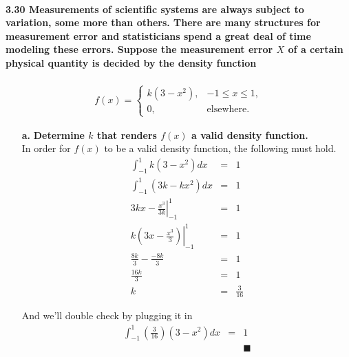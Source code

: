 \documentclass{article}
\begin{document}
\paragraph{3.30 Measurements of scientific systems are always subject to
variation, some more than others. There are many structures for measurement 
error and statisticians spend a great deal of time modeling these errors. 
Suppose the measurement error $X$ of a certain physical quantity is decided 
by the density function}
\begin{eqnarray*}
f(x) = \left\{ \begin{array}{ll}
	k(3-x^2), & -1 \leq x \leq 1,\\
	0, & \mbox{elsewhere.}
	\end{array} \right.
\end{eqnarray*}
\begin{enumerate}
\item[\textbf{a.}] \textbf{Determine $k$ that renders $f(x)$ a valid density
function.\\}
In order for $f(x)$ to be a valid density function, the following must hold.
\begin{eqnarray*}
\int_{-1}^1 k(3-x^2)dx & = & 1\\
\int_{-1}^1 (3k-kx^2)dx & = & 1\\
\left. 3kx - \frac{x^3}{3k} \right|_{-1}^{1} & = & 1\\
\left. k(3x - \frac{x^3}{3}) \right|_{-1}^{1} & = & 1\\
\frac{8k}{3} - \frac{-8k}{3} & = & 1\\
\frac{16k}{3} & = & 1\\
k & = & \frac{3}{16}
\end{eqnarray*}

And we'll double check by plugging it in
\begin{eqnarray*}
\int_{-1}^1 \left(\frac{3}{16}\right)(3-x^2)dx & = & 1\\
& &  \blacksquare
\end{eqnarray*}

\end{enumerate}
\end{document}

